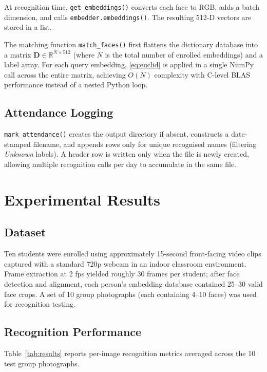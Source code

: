 \documentclass[conference]{IEEEtran}
\begin{document}
At recognition time, \texttt{get\_embeddings()} converts each face to
RGB, adds a batch dimension, and calls \texttt{embedder.embeddings()}.
The resulting 512-D vectors are stored in a list.

The matching function \texttt{match\_faces()} first flattens the
dictionary database into a matrix $\mathbf{D} \in \mathbb{R}^{N \times 512}$
(where $N$ is the total number of enrolled embeddings) and a label
array. For each query embedding, \eqref{eq:euclid} is applied in a
single NumPy call across the entire matrix, achieving $O(N)$ complexity
with C-level BLAS performance instead of a nested Python loop.

\subsection{Attendance Logging}

\texttt{mark\_attendance()} creates the output directory if absent,
constructs a date-stamped filename, and appends rows only for
unique recognised names (filtering \emph{Unknown} labels). A header row
is written only when the file is newly created, allowing multiple
recognition calls per day to accumulate in the same file.


\section{Experimental Results}

\subsection{Dataset}

Ten students were enrolled using approximately 15-second front-facing
video clips captured with a standard 720p webcam in an indoor classroom
environment. Frame extraction at 2 fps yielded roughly 30 frames per
student; after face detection and alignment, each person's embedding
database contained 25--30 valid face crops. A set of 10 group photographs
(each containing 4--10 faces) was used for recognition testing.

\subsection{Recognition Performance}

Table~\ref{tab:results} reports per-image recognition metrics averaged
across the 10 test group photographs.
\end{document}
